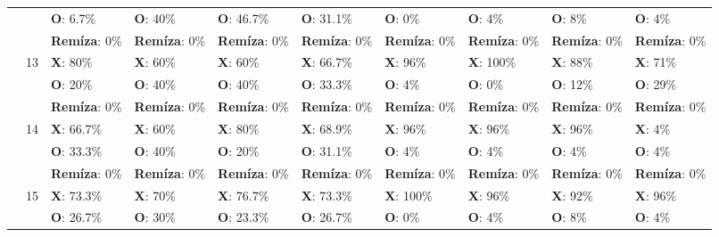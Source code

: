 \begin{table}[H]
\begin{tiny}
\begin{tabular}{|l|l|l|l|l||l|||l|l|l||l|}
            & & \textbf{O}: 6.7\% & \textbf{O}: 40\% & \textbf{O}: 46.7\% & \textbf{O}: 31.1\%                          & \textbf{O}: 0\% & \textbf{O}: 4\% & \textbf{O}: 8\% & \textbf{O}: 4\% \\
            & & \textbf{Remíza}: 0\% & \textbf{Remíza}: 0\% & \textbf{Remíza}: 0\% & \textbf{Remíza}: 0\%               & \textbf{Remíza}: 0\% & \textbf{Remíza}: 0\% & \textbf{Remíza}: 0\% & \textbf{Remíza}: 0\% \\
            \cline{2-10}
            & \multirow{3}{*}{13}
            & \textbf{X}: 80\% & \textbf{X}: 60\% & \textbf{X}: 60\% & \textbf{X}: 66.7\%                               & \textbf{X}: 96\% & \textbf{X}: 100\% & \textbf{X}: 88\% & \textbf{X}: 71\% \\
            & & \textbf{O}: 20\% & \textbf{O}: 40\% & \textbf{O}: 40\% & \textbf{O}: 33.3\%                             & \textbf{O}: 4\% & \textbf{O}: 0\% & \textbf{O}: 12\% & \textbf{O}: 29\% \\
            & & \textbf{Remíza}: 0\% & \textbf{Remíza}: 0\% & \textbf{Remíza}: 0\% & \textbf{Remíza}: 0\%               & \textbf{Remíza}: 0\% & \textbf{Remíza}: 0\% & \textbf{Remíza}: 0\% & \textbf{Remíza}: 0\% \\
            \cline{2-10}
            & \multirow{3}{*}{14}
            & \textbf{X}: 66.7\% & \textbf{X}: 60\% & \textbf{X}: 80\% & \textbf{X}: 68.9\%                             & \textbf{X}: 96\% & \textbf{X}: 96\% & \textbf{X}: 96\% & \textbf{X}: 4\% \\
            & & \textbf{O}: 33.3\% & \textbf{O}: 40\% & \textbf{O}: 20\% & \textbf{O}: 31.1\%                           & \textbf{O}: 4\% & \textbf{O}: 4\% & \textbf{O}: 4\% & \textbf{O}: 4\% \\
            & & \textbf{Remíza}: 0\% & \textbf{Remíza}: 0\% & \textbf{Remíza}: 0\% & \textbf{Remíza}: 0\%               & \textbf{Remíza}: 0\% & \textbf{Remíza}: 0\% & \textbf{Remíza}: 0\% & \textbf{Remíza}: 0\% \\
            \cline{2-10}
            & \multirow{3}{*}{15}
            & \textbf{X}: 73.3\% & \textbf{X}: 70\% & \textbf{X}: 76.7\% & \textbf{X}: 73.3\%                           & \textbf{X}: 100\% & \textbf{X}: 96\% & \textbf{X}: 92\% & \textbf{X}: 96\% \\
            & & \textbf{O}: 26.7\% & \textbf{O}: 30\% & \textbf{O}: 23.3\% & \textbf{O}: 26.7\%                         & \textbf{O}: 0\% & \textbf{O}: 4\% & \textbf{O}: 8\% & \textbf{O}: 4\% \\

\end{tabular}
\end{tiny}
\end{table}
